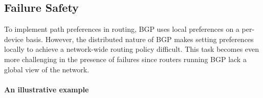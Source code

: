 \documentclass[10pt]{sigalternate052015}
\newcommand{\para}[1]{\paragraph*{\textbf{#1}}}
\begin{document}
%
%

\subsection{Failure Safety}

To implement path preferences in routing, BGP uses local preferences on a per-device basis. However, the distributed nature of BGP makes setting preferences locally to achieve a network-wide routing policy difficult. This task becomes even more challenging in the presence of failures since routers running BGP lack a global view of the network.

\para{An illustrative example}
\end{document}
